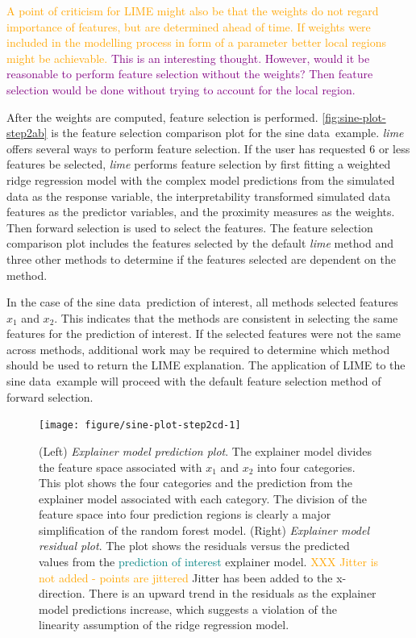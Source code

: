 \documentclass[AMS,STIX2COL]{WileyNJD-v2}\usepackage[]{graphicx}\usepackage[]{color}
\newenvironment{knitrout}{}{} %
\newcommand{\hh}[1]{\textcolor{orange}{#1}}
\newcommand{\kgc}[1]{\textcolor{purple}{#1}}
\newcommand{\kge}[1]{\textcolor{teal}{#1}}
\newcommand{\data}{sine data}
\begin{document}
{\hh{A point of criticism for LIME might also be that the weights do not regard importance of features, but are determined ahead of time. If weights were included in the modelling process in form of a parameter better local regions might be achievable.} \kgc{This is an interesting thought. However, would it be reasonable to perform feature selection without the weights? Then feature selection would be done without trying to account for the local region.}

After the weights are computed, feature selection is performed. \autoref{fig:sine-plot-step2ab} is the feature selection comparison plot for the \data \ example. \emph{lime} offers several ways to perform feature selection. If the user has requested 6 or less features be selected, \emph{lime} performs feature selection by first fitting a weighted ridge regression model with the complex model predictions from the simulated data as the response variable, the interpretability transformed simulated data features as the predictor variables, and the proximity measures as the weights. Then forward selection is used to select the features. The feature selection comparison plot includes the features selected by the default \emph{lime} method and three other methods to determine if the features selected are dependent on the method.

In the case of the \data \ prediction of interest, all methods selected features $x_1$ and $x_2$. This indicates that the methods are consistent in selecting the same features for the prediction of interest. If the selected features were not the same across methods, additional work may be required to determine which method should be used to return the LIME explanation. The application of LIME to the \data \ example will proceed with the default feature selection method of forward selection.



\begin{figure}[!htbp]
\begin{knitrout}
\color{fgcolor}
\texttt{[image: figure/sine-plot-step2cd-1]} 

\end{knitrout}
\caption{(Left) \emph{Explainer model prediction plot}. The explainer model divides the feature space associated with $x_1$ and $x_2$ into four categories. This plot shows the four categories and the prediction from the explainer model associated with each category. The division of the feature space into four prediction regions  is clearly a major simplification of the random forest model. (Right) \emph{Explainer model residual plot}. The plot shows the residuals versus the predicted values  from the \kge{prediction of interest} explainer model. \hh{XXX Jitter is not added - points are jittered} Jitter has been added to the x-direction. There is an upward trend in the residuals as the explainer model predictions increase, which suggests a violation of the linearity assumption of the ridge regression model.}
\label{fig:sine-plot-step2cd}
\end{figure}

}
\end{document}
